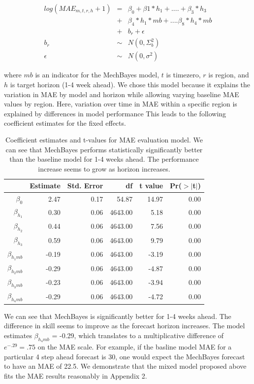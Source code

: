 \documentclass{umassthesis}          %
\begin{document}
\begin{eqnarray*}
log(MAE_{m,t,r,h} +1) &=& \beta_0 +  \beta1*h_1 + ....+ \beta_3*h_3 \\
&+& \beta_4 *h_1*mb + .... \beta_8*h_4*mb\\
 &+& b_{r} + \epsilon \\
b_{r} &\sim &N(0,\Sigma_b^2)\\
\epsilon &\sim& N(0,\sigma^2)
\end{eqnarray*}

where $mb$ is an indicator for the MechBayes model, $t$ is timezero, $r$ is region, and $h$ is target horizon (1-4 week ahead). We chose this model because it explains the variation in MAE by model and horizon while allowing varying baseline MAE values by region. Here, variation over time in MAE within a specific region is explained by differences in model performance This leads to the following coefficient estimates for the fixed effects.

\begin{table}[ht]
\centering
\begin{tabular}{rrrrrr}
  \hline
 & Estimate & Std. Error & df & t value & Pr($>$$|$t$|$) \\ 
  \hline
$\beta_0$  & 2.47 & 0.17 & 54.87 & 14.97 & 0.00 \\ 
   $\beta_{h_1}$ & 0.30 & 0.06 & 4643.00 & 5.18 & 0.00 \\ 
 $\beta_{h_2} $ & 0.44 & 0.06 & 4643.00 & 7.56 & 0.00 \\ 
  $\beta_{h_3}$ & 0.59 & 0.06 & 4643.00 & 9.79 & 0.00 \\ 
  $\beta_{h_1 mb}$  & -0.19 & 0.06 & 4643.00 & -3.19 & 0.00 \\ 
  $\beta_{h_2 mb}$ & -0.29 & 0.06 & 4643.00 & -4.87 & 0.00 \\ 
   $\beta_{h_3mb}$ & -0.23 & 0.06 & 4643.00 & -3.94 & 0.00 \\ 
 $\beta_{h_4mb}$ & -0.29 & 0.06 & 4643.00 & -4.72 & 0.00 \\ 
   \hline
\end{tabular}
\caption{Coefficient estimates and t-values for MAE evaluation model. We can see that MechBayes performs statistically significantly better than the baseline model for 1-4 weeks ahead. The performance increase seems to grow as horizon increases.}
\end{table}

We can see that MechBayes is significantly better for 1-4 weeks ahead. The difference in skill seems to improve as the forecast horizon increases. The model estimates $\beta_{h_4mb}$ = -0.29, which translates to a multiplicative difference of $e^{-.29}=.75$ on the MAE scale. For example, if the basline model MAE for a particular 4 step ahead forecast is 30, one would expect the MechBayes forecast to have an MAE of 22.5.  We demonstrate that the mixed model proposed above fits the MAE results reasonably in Appendix 2.
\end{document}

